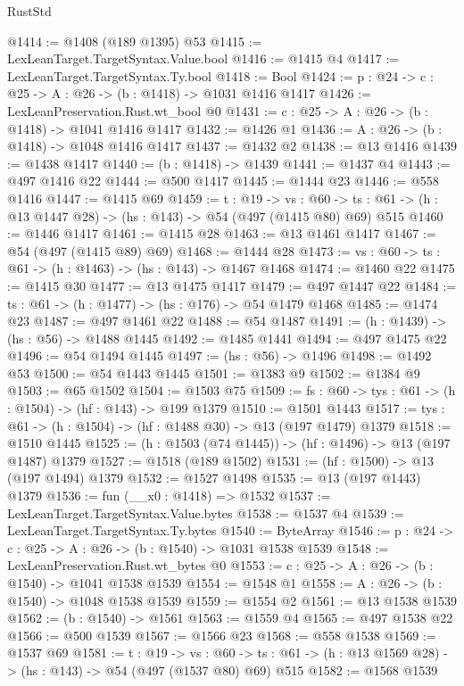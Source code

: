 \begin{lexlean}{RustStd}
\begin{coremodule}
{\begin{coremodule}
{{{{{{{{{{{{@1414 := @1408 (@189 @1395) @53
@1415 := LexLeanTarget.TargetSyntax.Value.bool
@1416 := @1415 @4
@1417 := LexLeanTarget.TargetSyntax.Ty.bool
@1418 := Bool
@1424 := {p : @24} -> {c : @25} -> {A : @26} -> (b : @1418) -> @1031 @1416 @1417
@1426 := LexLeanPreservation.Rust.wt_bool @0
@1431 := {c : @25} -> {A : @26} -> (b : @1418) -> @1041 @1416 @1417
@1432 := @1426 @1
@1436 := {A : @26} -> (b : @1418) -> @1048 @1416 @1417
@1437 := @1432 @2
@1438 := @13 @1416
@1439 := @1438 @1417
@1440 := (b : @1418) -> @1439
@1441 := @1437 @4
@1443 := @497 @1416 @22
@1444 := @500 @1417
@1445 := @1444 @23
@1446 := @558 @1416
@1447 := @1415 @69
@1459 := {t : @19} ->
  {vs : @60} -> {ts : @61} -> (h : @13 @1447 @28) -> (hs : @143) -> @54 (@497 (@1415 @80) @69) @515
@1460 := @1446 @1417
@1461 := @1415 @28
@1463 := @13 @1461 @1417
@1467 := @54 (@497 (@1415 @89) @69)
@1468 := @1444 @28
@1473 := {vs : @60} -> {ts : @61} -> (h : @1463) -> (hs : @143) -> @1467 @1468
@1474 := @1460 @22
@1475 := @1415 @30
@1477 := @13 @1475 @1417
@1479 := @497 @1447 @22
@1484 := {ts : @61} -> (h : @1477) -> (hs : @176) -> @54 @1479 @1468
@1485 := @1474 @23
@1487 := @497 @1461 @22
@1488 := @54 @1487
@1491 := (h : @1439) -> (hs : @56) -> @1488 @1445
@1492 := @1485 @1441
@1494 := @497 @1475 @22
@1496 := @54 @1494 @1445
@1497 := (hs : @56) -> @1496
@1498 := @1492 @53
@1500 := @54 @1443 @1445
@1501 := @1383 @9
@1502 := @1384 @9
@1503 := @65 @1502
@1504 := @1503 @75
@1509 := {fs : @60} -> {tys : @61} -> (h : @1504) -> (hf : @143) -> @199 @1379
@1510 := @1501 @1443
@1517 := {tys : @61} -> (h : @1504) -> (hf : @1488 @30) -> @13 (@197 @1479) @1379
@1518 := @1510 @1445
@1525 := (h : @1503 (@74 @1445)) -> (hf : @1496) -> @13 (@197 @1487) @1379
@1527 := @1518 (@189 @1502)
@1531 := (hf : @1500) -> @13 (@197 @1494) @1379
@1532 := @1527 @1498
@1535 := @13 (@197 @1443) @1379
@1536 := fun (__x0 : @1418) => @1532
@1537 := LexLeanTarget.TargetSyntax.Value.bytes
@1538 := @1537 @4
@1539 := LexLeanTarget.TargetSyntax.Ty.bytes
@1540 := ByteArray
@1546 := {p : @24} -> {c : @25} -> {A : @26} -> (b : @1540) -> @1031 @1538 @1539
@1548 := LexLeanPreservation.Rust.wt_bytes @0
@1553 := {c : @25} -> {A : @26} -> (b : @1540) -> @1041 @1538 @1539
@1554 := @1548 @1
@1558 := {A : @26} -> (b : @1540) -> @1048 @1538 @1539
@1559 := @1554 @2
@1561 := @13 @1538 @1539
@1562 := (b : @1540) -> @1561
@1563 := @1559 @4
@1565 := @497 @1538 @22
@1566 := @500 @1539
@1567 := @1566 @23
@1568 := @558 @1538
@1569 := @1537 @69
@1581 := {t : @19} ->
  {vs : @60} -> {ts : @61} -> (h : @13 @1569 @28) -> (hs : @143) -> @54 (@497 (@1537 @80) @69) @515
@1582 := @1568 @1539
}}}}}}}}}}}}
\end{coremodule}}
\end{coremodule}
\end{lexlean}
